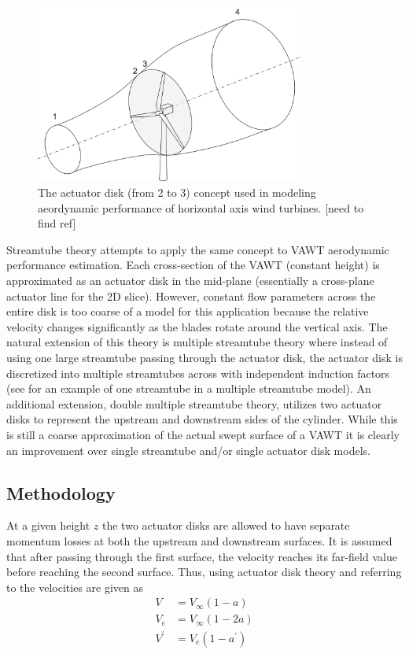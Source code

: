 \documentclass{article}
\begin{document}
\begin{figure}[htbp]
\begin{center}
\includegraphics[width=3.5in]{images/actuatordisk}
\caption{The actuator disk (from 2 to 3) concept used in modeling aeordynamic performance of horizontal axis wind turbines.  [need to find ref]}
\label{fig:actuatordisk}
\end{center}
\end{figure}

Streamtube theory attempts to apply the same concept to VAWT aerodynamic performance estimation.  Each cross-section of the VAWT (constant height) is approximated as an actuator disk in the mid-plane (essentially a cross-plane actuator line for the 2D slice). However, constant flow parameters across the entire disk is too coarse of a model for this application because the relative velocity changes significantly as the blades rotate around the vertical axis.  The natural extension of this theory is multiple streamtube theory where instead of using one large streamtube passing through the actuator disk, the actuator disk is discretized into multiple streamtubes across with independent induction factors (see  for an example of one streamtube in a multiple streamtube model).  An additional extension, double multiple streamtube theory, utilizes two actuator disks to represent the upstream and downstream sides of the cylinder.  While this is still a coarse approximation of the actual swept surface of a VAWT it is clearly an improvement over single streamtube and/or single actuator disk models.

\subsection{Methodology}
At a given height $z$ the two actuator disks are allowed to have separate momentum losses at both the upstream and downstream surfaces.  It is assumed that after passing through the first surface, the velocity reaches its far-field value before reaching the second surface.  Thus, using actuator disk theory and referring to  the velocities are given as
\begin{align}
V &= V_\infty (1-a) \label{eq:V}\\
V_e &= V_\infty (1-2a) \label{eq:Ve}\\
V^\prime &= V_e (1-a^\prime) \label{eq:Vprime}
\end{align}
\end{document}
